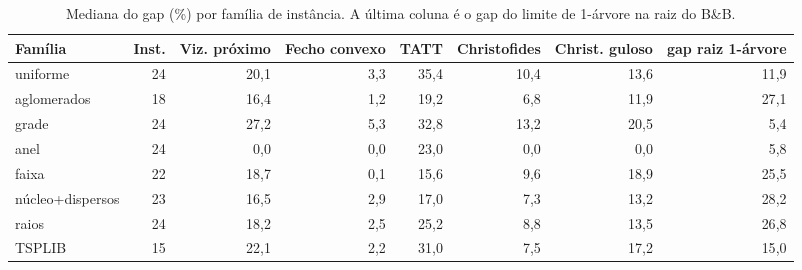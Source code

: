 \begin{table}[htb]
\centering
\caption{Mediana do gap (\%) por família de instância. A última coluna é o gap do limite de 1-árvore na raiz do B\&B.}
\label{tab:familias}
\small
\begin{adjustbox}{max width=\linewidth}
\begin{tabular}{lrrrrrrr}
\toprule
Família & Inst. & Viz. próximo & Fecho convexo & TATT & Christofides & Christ. guloso & gap raiz 1-árvore \\
\midrule
uniforme & 24 & 20{,}1 & 3{,}3 & 35{,}4 & 10{,}4 & 13{,}6 & 11{,}9 \\
aglomerados & 18 & 16{,}4 & 1{,}2 & 19{,}2 & 6{,}8 & 11{,}9 & 27{,}1 \\
grade & 24 & 27{,}2 & 5{,}3 & 32{,}8 & 13{,}2 & 20{,}5 & 5{,}4 \\
anel & 24 & 0{,}0 & 0{,}0 & 23{,}0 & 0{,}0 & 0{,}0 & 5{,}8 \\
faixa & 22 & 18{,}7 & 0{,}1 & 15{,}6 & 9{,}6 & 18{,}9 & 25{,}5 \\
núcleo+dispersos & 23 & 16{,}5 & 2{,}9 & 17{,}0 & 7{,}3 & 13{,}2 & 28{,}2 \\
raios & 24 & 18{,}2 & 2{,}5 & 25{,}2 & 8{,}8 & 13{,}5 & 26{,}8 \\
TSPLIB & 15 & 22{,}1 & 2{,}2 & 31{,}0 & 7{,}5 & 17{,}2 & 15{,}0 \\
\bottomrule
\end{tabular}
\end{adjustbox}
\end{table}
